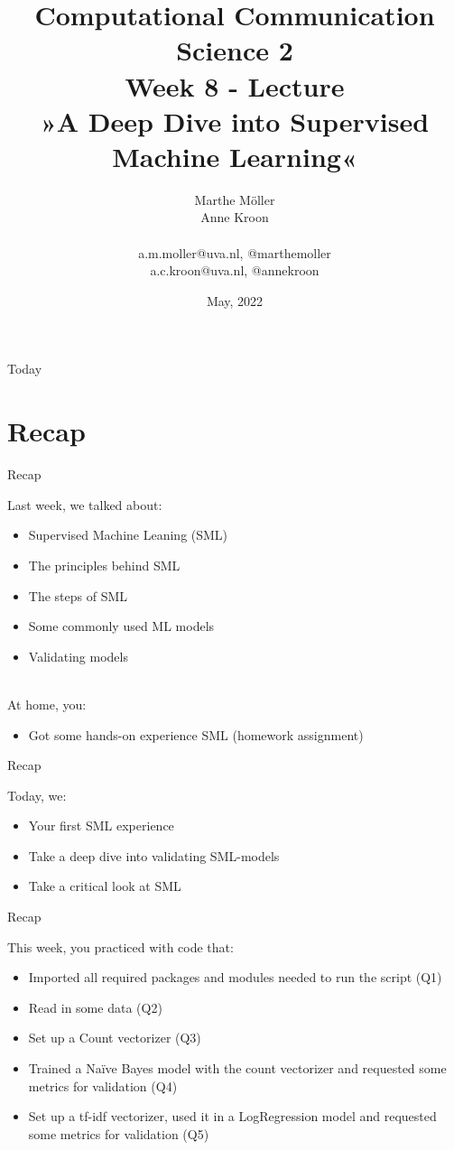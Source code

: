 \documentclass[handout]{beamer}
\title[Computational Communication Science 2]{\textbf{Computational Communication Science 2} \\Week 8 - Lecture\\ »A Deep Dive into Supervised Machine Learning«}
\author[Marthe Möller, Anne Kroon]{Marthe Möller \\ Anne Kroon \\ ~ \\ \footnotesize{a.m.moller@uva.nl, @marthemoller \\a.c.kroon@uva.nl, @annekroon} \\}
\date{May, 2022}
\institute[Digital Society Minor, University of Amsterdam]{Digital Society Minor, University of Amsterdam}
\begin{document}
	
	\begin{frame}{}
		\titlepage
\end{frame}
	
\begin{frame}{Today}
		\tableofcontents
\end{frame}


\section{Recap}

\begin{frame}{Recap}
	
Last week, we talked about:
	\begin{itemize}
		\item Supervised Machine Leaning (SML)
		\item The principles behind SML
		\item The steps of SML
		\item Some commonly used ML models
		\item Validating models \\\
	\end{itemize}
	
At home, you:
	\begin{itemize}
		\item Got some hands-on experience SML (homework assignment)
	\end{itemize}
	
\end{frame}


\begin{frame}{Recap}
	
Today, we:
	\begin{itemize}
		\item Your first SML experience
		\item Take a deep dive into validating SML-models
		\item Take a critical look at SML 
	\end{itemize}
	
\end{frame}


\begin{frame}{Recap}
	
This week, you practiced with code that:
\begin{itemize}
	\item Imported all required packages and modules needed to run the script (Q1)
	\item Read in some data (Q2)
	\item Set up a Count vectorizer (Q3)
	\item Trained a Naïve Bayes model with the count vectorizer and requested some metrics for validation (Q4)
	\item Set up a tf-idf vectorizer, used it in a LogRegression model and requested some metrics for validation (Q5)
\end{itemize}
	
\end{frame}
\end{document}

